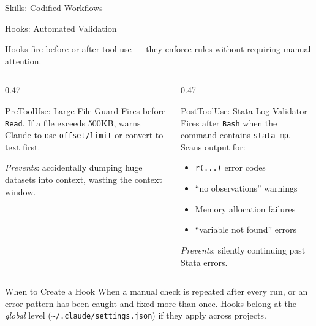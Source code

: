 \documentclass[aspectratio=169,11pt]{beamer}
\begin{document}
\begin{frame}{Skills: Codified Workflows}
\end{frame}

\begin{frame}[shrink=10]{Hooks: Automated Validation}

\small Hooks fire before or after tool use --- they enforce rules without requiring manual attention.

\smallskip

\begin{columns}[T]
\begin{column}{0.47\textwidth}

\begin{block}{PreToolUse: Large File Guard}
\small
Fires before \texttt{Read}. If a file exceeds 500KB, warns Claude to use \texttt{offset/limit} or convert to text first.
\medskip

\textit{Prevents}: accidentally dumping huge datasets into context, wasting the context window.
\end{block}

\end{column}
\begin{column}{0.47\textwidth}

\begin{block}{PostToolUse: Stata Log Validator}
\small
Fires after \texttt{Bash} when the command contains \texttt{stata-mp}. Scans output for:
\begin{itemize}\footnotesize
  \item \texttt{r(...)} error codes
  \item ``no observations'' warnings
  \item Memory allocation failures
  \item ``variable not found'' errors
\end{itemize}
\medskip

\textit{Prevents}: silently continuing past Stata errors.
\end{block}

\end{column}
\end{columns}

\smallskip

\begin{exampleblock}{When to Create a Hook}
\small When a manual check is repeated after every run, or an error pattern has been caught and fixed more than once. Hooks belong at the \textit{global} level (\texttt{\textasciitilde/.claude/settings.json}) if they apply across projects.
\end{exampleblock}

\end{frame}
\end{document}
